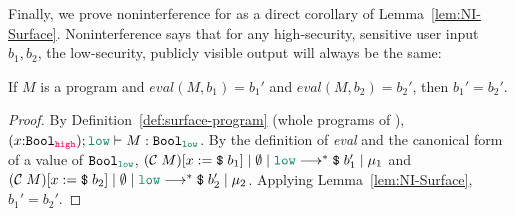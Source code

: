 {\color{NavyBlue} %
Finally, we prove noninterference for \Surface as a direct corollary of
Lemma~\ref{lem:NI-Surface}. Noninterference says that for any high-security,
sensitive user input $b_1, b_2$, the low-security, publicly visible output will
always be the same:

\begin{theorem}
  \label{thm:NI-Surface}
  If $M$ is a \Surface program and $\mathit{eval}(M,b_1)=b_1'$ and $\mathit{eval}(M,b_2)=b_2'$,
  then $b_1' = b_2'$.
\end{theorem}
\begin{proof}
  By Definition~\ref{def:surface-program} (whole programs of \Surface),
  $(x{:}\Bool_{\high}) ; \low \vdash M : \Bool_{\low}$. By the definition of
  \textit{eval} and the canonical form of a value of $\Bool_{\low}$,
  $\reducemult{(\compile{M}) [ x := \ccconst{b_1}]}{\emptyset}{\low}{\ccconst{b_1'}}{\mu_1}$ and
  $\reducemult{(\compile{M}) [ x := \ccconst{b_2}]}{\emptyset}{\low}{\ccconst{b_2'}}{\mu_2}$.
  Applying Lemma~\ref{lem:NI-Surface}, $b_1'=b_2'$.
\end{proof}

} %
